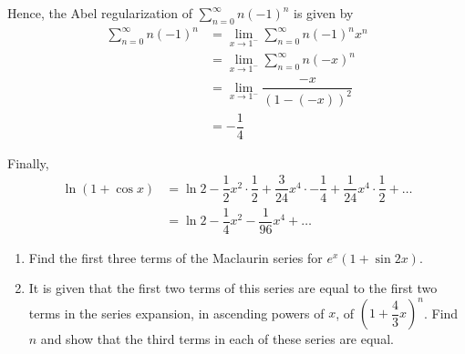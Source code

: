 \documentclass{echw}
\begin{document}
        Hence, the Abel regularization of $\sum\limits_{n=0}^\infty n(-1)^n$ is given by
        \begin{align*}
            \sum_{n=0}^\infty n(-1)^n &= \lim_{x \to 1^-} \sum_{n=0}^\infty n(-1)^n x^n\\
            &= \lim_{x \to 1^-} \sum_{n=0}^\infty n(-x)^n\\
            &= \lim_{x \to 1^-} \dfrac{-x}{(1-(-x))^2}\\
            &= -\dfrac14
        \end{align*}

        Finally,
        \begin{align*}
            \ln (1 + \cos x) &= \ln 2 - \dfrac12 x^2 \cdot \dfrac12 + \dfrac{3}{24} x^4 \cdot -\dfrac14 + \dfrac1{24} x^4 \cdot\dfrac12 + \ldots\\
            &= \ln 2 - \dfrac14 x^2 - \dfrac1{96}x^4 + \ldots
        \end{align*}

     
    \problem{}
        \begin{enumerate}
            \item Find the first three terms of the Maclaurin series for $e^x (1 + \sin 2x)$.
            \item It is given that the first two terms of this series are equal to the first two terms in the series expansion, in ascending powers of $x$, of $\left(1 + \dfrac43 x\right)^n$. Find $n$ and show that the third terms in each of these series are equal.
        \end{enumerate}
        
    \solution
\end{document}
